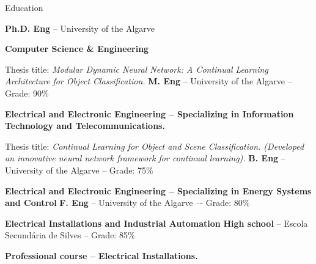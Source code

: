 \begin{rubric}{Education}


  \entry*[2021 -- Present]
  \textbf{Ph.D. Eng} -- University of the Algarve

  \vspace{0.1cm}
  \par \textbf{Computer Science \& Engineering}

  \vspace{0.1cm}
  \par Thesis title: \emph{ Modular Dynamic Neural Network: A Continual Learning Architecture for Object
    Classification.}
  \vspace{0.35cm}
  \entry*[2018 -- 2020]
  \textbf{M. Eng} -- University of the Algarve -- Grade: 90\%

  \vspace{0.2cm}
  \par \textbf{Electrical and Electronic Engineering – Specializing in Information Technology and
    Telecommunications.}

  \vspace{0.1cm}
  \par Thesis title: \emph{ Continual Learning for Object and Scene Classification. (Developed an innovative
    neural network framework for continual learning).}
  \vspace{0.35cm}
  \entry*[2015 -- 2018]
  \textbf{B. Eng} -- University of the Algarve -- Grade: 75\%

  \vspace{0.2cm}
  \par \textbf{Electrical and Electronic Engineering – Specializing in Energy Systems and Control}
  \vspace{0.35cm}
  \entry*[2013 -- 2015]
  \textbf{F. Eng} -- University of the Algarve –- Grade: 80\%

  \vspace{0.2cm}
  \par \textbf{Electrical Installations and Industrial Automation}
  \vspace{0.35cm}
  \entry*[2010 -- 2013]
  \textbf{High school} -- Escola Secundária de Silves – Grade: 85\%

  \vspace{0.2cm}
  \par \textbf{Professional course – Electrical Installations.}
\end{rubric}